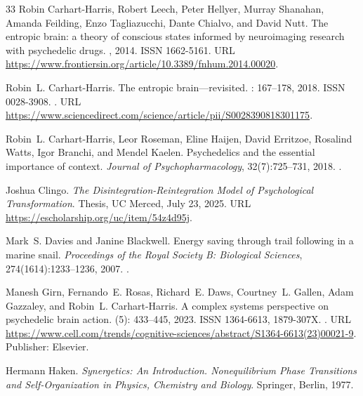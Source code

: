 \documentclass[12pt,fleqn]{article}
\begin{document}
\begin{thebibliography}{33}
  Robin Carhart-Harris, Robert Leech, Peter Hellyer, Murray Shanahan, Amanda
  Feilding, Enzo Tagliazucchi, Dante Chialvo, and David Nutt.
  \newblock The entropic brain: a theory of conscious states informed by
  neuroimaging research with psychedelic drugs.
  , 2014.
  \newblock ISSN 1662-5161.
  \newblock URL
  \url{https://www.frontiersin.org/article/10.3389/fnhum.2014.00020}.

  Robin~L. Carhart-Harris.
  \newblock The entropic brain---revisited.
  : 167--178, 2018.
  \newblock ISSN 0028-3908.
  \newblock {}.
  \newblock URL
  \url{https://www.sciencedirect.com/science/article/pii/S0028390818301175}.

  Robin~L. Carhart-Harris, Leor Roseman, Eline Haijen, David Erritzoe,
  Rosalind Watts, Igor Branchi, and Mendel Kaelen.
  \newblock Psychedelics and the essential importance of context.
  \newblock \emph{Journal of Psychopharmacology}, 32(7):725--731, 2018.
  \newblock {}.

  Joshua Clingo.
  \newblock \emph{The Disintegration-Reintegration Model of Psychological Transformation}.
  \newblock Thesis, UC Merced, July 23, 2025.
  \newblock URL \url{https://escholarship.org/uc/item/54z4d95j}.

  Mark~S. Davies and Janine Blackwell.
  \newblock Energy saving through trail following in a marine snail.
  \newblock \emph{Proceedings of the Royal Society B: Biological Sciences},
  274(1614):1233--1236, 2007.
  \newblock {}.

  Manesh Girn, Fernando~E. Rosas, Richard~E. Daws, Courtney~L. Gallen, Adam
  Gazzaley, and Robin~L. Carhart-Harris.
  \newblock A complex systems perspective on psychedelic brain action.
   (5): 433--445, 2023.
  \newblock ISSN 1364-6613, 1879-307X.
  \newblock {}.
  \newblock URL
  \url{https://www.cell.com/trends/cognitive-sciences/abstract/S1364-6613(23)00021-9}.
  \newblock Publisher: Elsevier.

  Hermann Haken.
  \newblock \emph{Synergetics: An Introduction. Nonequilibrium Phase Transitions
  and Self-Organization in Physics, Chemistry and Biology}.
  \newblock Springer, Berlin, 1977.


\end{thebibliography}
\end{document}
